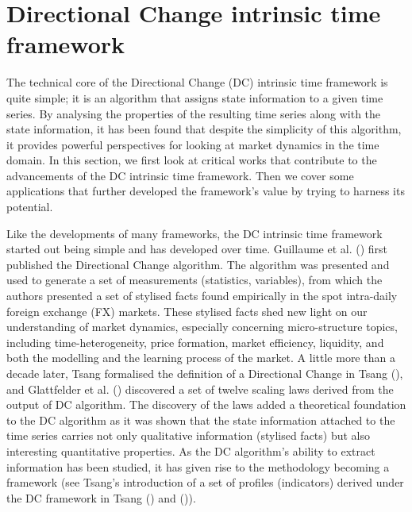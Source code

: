 \section{Directional Change intrinsic time framework}\label{sec: dc}

The technical core of the Directional Change (DC) intrinsic time framework is quite simple; it is an algorithm that assigns state information to a given time series. By analysing the properties of the resulting time series along with the state information, it has been found that despite the simplicity of this algorithm, it provides powerful perspectives for looking at market dynamics in the time domain. In this section, we first look at critical works that contribute to the advancements of the DC intrinsic time framework. Then we cover some applications that further developed the framework's value by trying to harness its potential.

Like the developments of many frameworks, the DC intrinsic time framework started out being simple and has developed over time. Guillaume et al. (\citeyear{guillaume1997bird}) first published the Directional Change algorithm. The algorithm was presented and used to generate a set of measurements (statistics, variables), from which the authors presented a set of stylised facts found empirically in the spot intra-daily foreign exchange (FX) markets. These stylised facts shed new light on our understanding of market dynamics, especially concerning micro-structure topics, including time-heterogeneity, price formation, market efficiency, liquidity, and both the modelling and the learning process of the market. A little more than a decade later, Tsang formalised the definition of a Directional Change in Tsang (\citeyear{tsang2010directional}), and Glattfelder et al. (\citeyear{glattfelder2011patterns}) discovered a set of twelve scaling laws derived from the output of DC algorithm. The discovery of the laws added a theoretical foundation to the DC algorithm as it was shown that the state information attached to the time series carries not only qualitative information (stylised facts) but also interesting quantitative properties. As the DC algorithm's ability to extract information has been studied, it has given rise to the methodology becoming a framework (see Tsang's introduction of a set of profiles (indicators) derived under the DC framework in Tsang (\citeyear{tsang2015profiling}) and (\citeyear{tsang2017profiling})).

